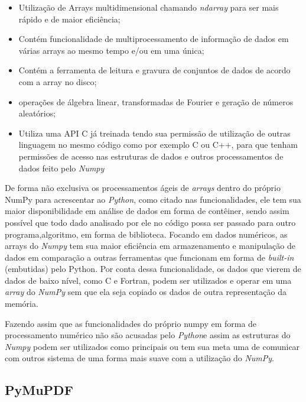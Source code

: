 \begin{itemize}
    \item Utilização de Arrays multidimensional chamando \textit{ndarray} para ser mais rápido e de maior eficiência;
    \item Contém funcionalidade de multiprocessamento de informação de dados em várias arrays ao mesmo tempo e/ou em uma única;
    \item Contém a ferramenta de leitura e gravura de conjuntos de dados de acordo com a array no disco;
    \item operações de álgebra linear, transformadas de Fourier e geração de números aleatórios;
    \item Utiliza uma API C já treinada tendo sua permissão de utilização de outras linguagem no mesmo código como por exemplo C ou C++, para que tenham permissões de acesso nas estruturas de dados e outros processamentos de dados feito pelo \textit{Numpy}
\end{itemize}
\par De forma não exclusiva os processamentos ágeis de \textit{arrays} dentro do próprio NumPy para acrescentar ao \textit{Python}, como citado nas funcionalidades, ele tem sua maior disponibilidade em análise de dados em forma de contêiner, sendo assim possível que todo dado analisado por ele no código possa ser passado para outro programa,algoritmo, em forma de biblioteca. Focando em dados numéricos, as arrays do \textit{Numpy} tem sua maior eficiência em armazenamento e manipulação de dados em comparação a outras ferramentas que funcionam em forma de \textit{built-in} (embutidas) pelo Python.
Por conta dessa funcionalidade, os dados que vierem de dados de baixo nível, como C e Fortran, podem ser utilizados e operar em uma \textit{array} do \textit{NumPy} sem que ela seja copiado os dados de outra representação da memória.

\par Fazendo assim que as funcionalidades do próprio numpy em forma de processamento numérico não são acusadas pelo \textit{Python}e assim as estruturas do \textit{Numpy} podem ser utilizados como principais ou tem sua meta uma de comunicar com outros sistema de uma forma mais suave com a utilização do \textit{NumPy}.






\subsection{PyMuPDF}\label{sec:Fitz}

